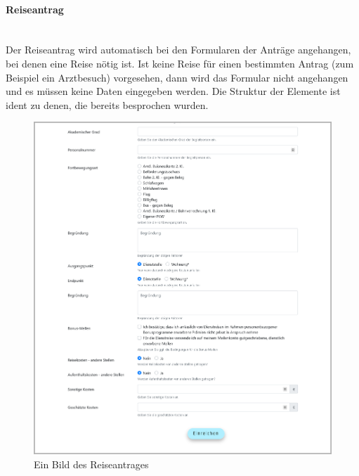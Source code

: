 \paragraph{Reiseantrag}
~\\
Der Reiseantrag wird automatisch bei den Formularen der Anträge angehangen, bei denen eine Reise nötig ist. Ist keine Reise für einen bestimmten Antrag (zum Beispiel ein Arztbesuch) vorgesehen, dann wird das Formular nicht angehangen und es müssen keine  Daten eingegeben werden. Die Struktur der Elemente ist ident zu denen, die bereits besprochen wurden.
\begin{figure}[H]
	\centering
	\includegraphics[width=1\linewidth]{images/website/zusatz_1}
	\caption[Reiseantrag]{Ein Bild des Reiseantrages}
	\label{fig:zusatz1}
\end{figure}

